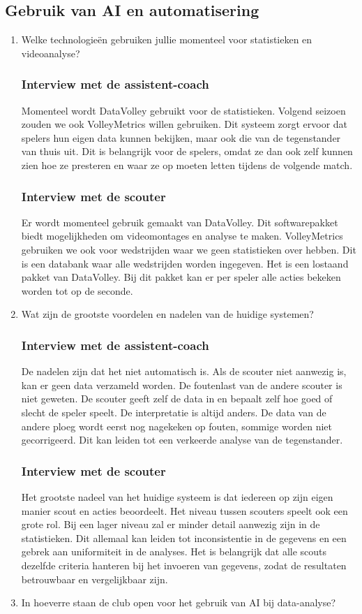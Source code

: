 \subsection{Gebruik van AI en automatisering}
\begin{enumerate}
  \item Welke technologieën gebruiken jullie momenteel voor statistieken en videoanalyse?
  \subsubsection{Interview met de assistent-coach}
  Momenteel wordt DataVolley gebruikt voor de statistieken. Volgend seizoen zouden we ook VolleyMetrics willen gebruiken. Dit systeem zorgt ervoor dat spelers hun eigen data kunnen bekijken, maar ook die van de tegenstander van thuis uit. Dit is belangrijk voor de spelers, omdat ze dan ook zelf kunnen zien hoe ze presteren en waar ze op moeten letten tijdens de volgende match.
  \subsubsection{Interview met de scouter}
  Er wordt momenteel gebruik gemaakt van DataVolley. Dit softwarepakket biedt mogelijkheden om videomontages en analyse te maken. VolleyMetrics gebruiken we ook voor wedstrijden waar we geen statistieken over hebben. Dit is een databank waar alle wedstrijden worden ingegeven. Het is een lostaand pakket van DataVolley. Bij dit pakket kan er per speler alle acties bekeken worden tot op de seconde. 
  \item Wat zijn de grootste voordelen en nadelen van de huidige systemen?
  \subsubsection{Interview met de assistent-coach}
  De nadelen zijn dat het niet automatisch is. Als de scouter niet aanwezig is, kan er geen data verzameld worden. De foutenlast van de andere scouter is niet geweten. De scouter geeft zelf de data in en bepaalt zelf hoe goed of slecht de speler speelt. De interpretatie is altijd anders. De data van de andere ploeg wordt eerst nog nagekeken op fouten, sommige worden niet gecorrigeerd. Dit kan leiden tot een verkeerde analyse van de tegenstander.
  \subsubsection{Interview met de scouter}
  Het grootste nadeel van het huidige systeem is dat iedereen op zijn eigen manier scout en acties beoordeelt. Het niveau tussen scouters speelt ook een grote rol. Bij een lager niveau zal er minder detail aanwezig zijn in de statistieken. Dit allemaal kan leiden tot inconsistentie in de gegevens en een gebrek aan uniformiteit in de analyses. Het is belangrijk dat alle scouts dezelfde criteria hanteren bij het invoeren van gegevens, zodat de resultaten betrouwbaar en vergelijkbaar zijn.
  \item In hoeverre staan de club open voor het gebruik van AI bij data-analyse?

\end{enumerate}
